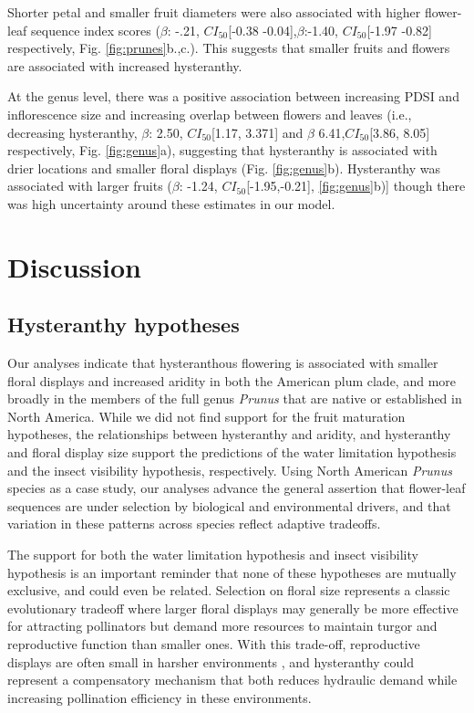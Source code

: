\documentclass{article}[11pt]
\begin{document}
{Shorter petal and smaller fruit diameters were also associated with higher flower-leaf sequence index scores ($\beta$: -.21, $CI_{50}$[-0.38 -0.04],$\beta$:-1.40, $CI_{50}$[-1.97 -0.82] respectively, Fig. \ref{fig:prunes}b.,c.). This suggests that smaller fruits and flowers are associated with increased hysteranthy.

At the genus level, there was a positive association between increasing PDSI and inflorescence size and increasing overlap between flowers and leaves (i.e., decreasing hysteranthy, $\beta$: 2.50, $CI_{50}$[1.17, 3.371] and $\beta$ 6.41,$CI_{50}$[3.86, 8.05] respectively, Fig. \ref{fig:genus}a), suggesting that hysteranthy is associated with drier locations and smaller floral displays (Fig. \ref{fig:genus}b). Hysteranthy was associated with larger fruits  ($\beta$: -1.24, $CI_{50}$[-1.95,-0.21], \ref{fig:genus}b)]  though there was high uncertainty around these estimates in our model. 

\section*{Discussion}

\subsection*{Hysteranthy hypotheses}
Our analyses indicate that hysteranthous flowering is associated with smaller floral displays and increased aridity in both the American plum clade, and more broadly in the members of the full genus \emph{Prunus} that are native or established in North America. While we did not find support for the fruit maturation hypotheses, the relationships between hysteranthy and aridity, and hysteranthy and floral display size support the predictions of the water limitation hypothesis and the insect visibility hypothesis, respectively. Using North American \textit{Prunus} species as a case study, our analyses advance the general assertion that flower-leaf sequences are under selection by biological and environmental drivers, and that variation in these patterns across species reflect adaptive tradeoffs. 

The support for both the water limitation hypothesis and insect visibility hypothesis is an important reminder that none of these hypotheses are mutually exclusive, and could even be related. Selection on floral size represents a classic evolutionary tradeoff where larger floral displays may generally be more effective for attracting pollinators but demand more resources to maintain turgor and reproductive function than smaller ones\citep{Galen:1999vr,Lambrecht:2007ur}. With this trade-off, reproductive displays are often small in harsher environments \citep{}, and hysteranthy could represent a compensatory mechanism that both reduces hydraulic demand while increasing pollination efficiency in these environments.

}
\end{document}
